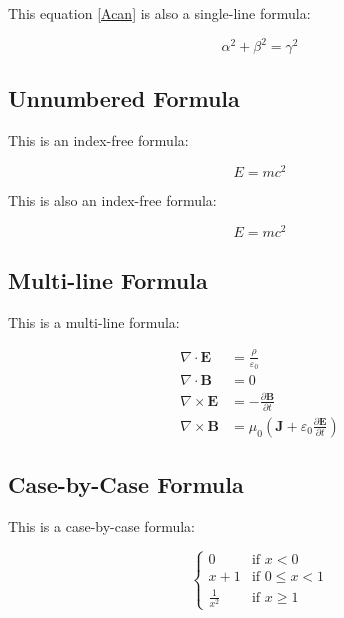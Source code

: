 \documentclass{article}
\begin{document}
	\par This equation \eqref{Acan} is also a single-line formula:
	
	\begin{equation}\label{Acan}
		\alpha^2+\beta^2 = \gamma^2
	\end{equation}

	\subsection{Unnumbered Formula}

	\par This is an index-free formula:
	
	\[E=mc^2\]
	
	\par This is also an index-free formula:
	
	$$E=mc^2$$

	\subsection{Multi-line Formula}

	\par This is a multi-line formula:

	\begin{equation}
		\begin{split}
			\nabla \cdot \mathbf{E} &= \frac{\rho}{\varepsilon_0} \\
    		\nabla \cdot \mathbf{B} &= 0 \\
    		\nabla \times \mathbf{E} &= -\frac{\partial \mathbf{B}}{\partial t} \\
    		\nabla \times \mathbf{B} &= \mu_0\left(\mathbf{J} + \varepsilon_0 \frac{\partial \mathbf{E}}{\partial t}\right)
		\end{split}
	\end{equation}

	\subsection{Case-by-Case Formula}

	\par This is a case-by-case formula:

	\begin{equation}
		\begin{cases}
			0&\text{if $x<0$} \\
			x+1&\text{if $0\leq x<1$} \\
			\frac{1}{x^2}&\text{if $x\geq 1$}
		\end{cases}
	\end{equation}
\end{document}
